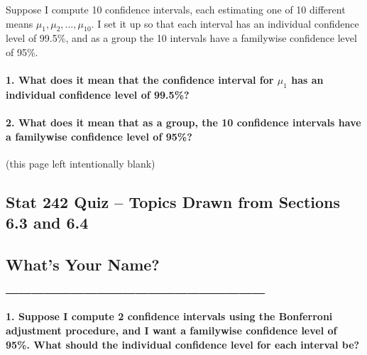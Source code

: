 \documentclass[]{article}
\let\oldparagraph\paragraph
\renewcommand{\paragraph}[1]{\oldparagraph{#1}\mbox{}}
\begin{document}
Suppose I compute 10 confidence intervals, each estimating one of 10
different means \(\mu_1, \mu_2, \ldots, \mu_{10}\). I set it up so that
each interval has an individual confidence level of 99.5\%, and as a
group the 10 intervals have a familywise confidence level of 95\%.

\paragraph{\texorpdfstring{1. What does it mean that the confidence
interval for \(\mu_1\) has an individual confidence level of
99.5\%?}{1. What does it mean that the confidence interval for \textbackslash{}mu\_1 has an individual confidence level of 99.5\%?}}\label{what-does-it-mean-that-the-confidence-interval-for-mu_1-has-an-individual-confidence-level-of-99.5}

\vspace{5cm}

\paragraph{2. What does it mean that as a group, the 10 confidence
intervals have a familywise confidence level of
95\%?}\label{what-does-it-mean-that-as-a-group-the-10-confidence-intervals-have-a-familywise-confidence-level-of-95}

\newpage

(this page left intentionally blank)

\newpage

\subsection{Stat 242 Quiz -- Topics Drawn from Sections 6.3 and
6.4}\label{stat-242-quiz-topics-drawn-from-sections-6.3-and-6.4-2}

\subsection{What's Your Name?
\_\_\_\_\_\_\_\_\_\_\_\_\_\_\_\_\_\_\_\_}\label{whats-your-name-____________________-2}

\paragraph{1. Suppose I compute 2 confidence intervals using the
Bonferroni adjustment procedure, and I want a familywise confidence
level of 95\%. What should the individual confidence level for each
interval
be?}\label{suppose-i-compute-2-confidence-intervals-using-the-bonferroni-adjustment-procedure-and-i-want-a-familywise-confidence-level-of-95.-what-should-the-individual-confidence-level-for-each-interval-be}
\end{document}
